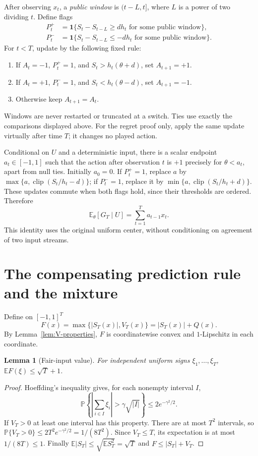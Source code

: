 \documentclass[11pt]{article}
\newtheorem{lemma}[theorem]{Lemma}
\theoremstyle{remark}\newtheorem{remark}[theorem]{Remark}
\newcommand{\EE}{\mathbb E}
\newcommand{\PP}{\mathbb P}
\newcommand{\clip}{\operatorname{clip}}
\begin{document}
After observing $x_t$, a \emph{public window} is $(t-L,t]$, where
$L$ is a power of two dividing $t$. Define flags
\begin{align*}
 P_t^+&=\mathbf 1\{S_t-S_{t-L}\ge dh_t
             \text{ for some public window}\},\\
 P_t^-&=\mathbf 1\{S_t-S_{t-L}\le-dh_t
             \text{ for some public window}\}.
\end{align*}
For $t<T$, update by the following fixed rule:
\begin{enumerate}[nosep]
\item If $A_t=-1$, $P_t^+=1$, and $S_t>h_t(\theta+d)$, set
      $A_{t+1}=+1$.
\item If $A_t=+1$, $P_t^-=1$, and $S_t<h_t(\theta-d)$, set
      $A_{t+1}=-1$.
\item Otherwise keep $A_{t+1}=A_t$.
\end{enumerate}
Windows are never restarted or truncated at a switch. Ties use exactly
the comparisons displayed above. For the regret proof only, apply the
same update virtually after time $T$; it changes no played action.

Conditional on $U$ and a deterministic input, there is a scalar endpoint
$a_t\in[-1,1]$ such that the action after observation $t$ is $+1$
precisely for $\theta<a_t$, apart from null ties. Initially $a_0=0$.
If $P_t^+=1$, replace $a$ by
$\max\{a,\clip(S_t/h_t-d)\}$; if $P_t^-=1$, replace it by
$\min\{a,\clip(S_t/h_t+d)\}$. These updates commute when both flags
hold, since their thresholds are ordered. Therefore
\begin{equation}\label{eq:scalar-reward}
 \EE_\theta[G_T\mid U]=\sum_{t=1}^T a_{t-1}x_t.
\end{equation}
This identity uses the original uniform center, without conditioning on
agreement of two input streams.




\section{The compensating prediction rule and the mixture}\label{sec:donor}
Define on $[-1,1]^T$
\begin{equation}\label{eq:F-definition}
 F(x)=\max\{|S_T(x)|,V_T(x)\}=|S_T(x)|+Q(x).
\end{equation}
By Lemma~\ref{lem:V-properties}, $F$ is coordinatewise convex and
$1$-Lipschitz in each coordinate.

\begin{lemma}[Fair-input value]\label{lem:fair-value}
For independent uniform signs $\xi_1,\ldots,\xi_T$,
$\EE F(\xi)\le\sqrt T+1$.
\end{lemma}
\begin{proof}
Hoeffding's inequality gives, for each nonempty interval $I$,
\[
 \PP\left\{\left|\sum_{i\in I}\xi_i\right|>
                      \gamma\sqrt{|I|}\right\}
 \le2e^{-\gamma^2/2}.
\]
If $V_T>0$ at least one interval has this property. There are at most
$T^2$ intervals, so
$\PP\{V_T>0\}\le2T^2e^{-\gamma^2/2}=1/(8T^2)$.
Since $V_T\le T$, its expectation is at most $1/(8T)\le1$.
Finally $\EE|S_T|\le\sqrt{\EE S_T^2}=\sqrt T$ and
$F\le|S_T|+V_T$.
\end{proof}
\end{document}
